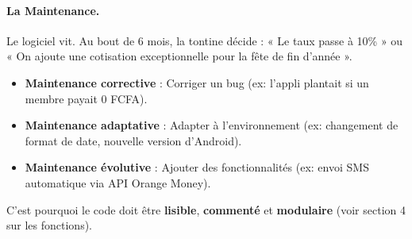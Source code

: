 \documentclass[11pt]{article}
\begin{document}
\paragraph{La Maintenance.}
Le logiciel vit. Au bout de 6 mois, la tontine décide : « Le taux passe à 10\% » ou « On ajoute une cotisation exceptionnelle pour la fête de fin d'année ».
\begin{itemize}
    \item \textbf{Maintenance corrective} : Corriger un bug (ex: l'appli plantait si un membre payait 0 FCFA).
    \item \textbf{Maintenance adaptative} : Adapter à l'environnement (ex: changement de format de date, nouvelle version d'Android).
    \item \textbf{Maintenance évolutive} : Ajouter des fonctionnalités (ex: envoi SMS automatique via API Orange Money).
\end{itemize}
C'est pourquoi le code doit être \textbf{lisible}, \textbf{commenté} et \textbf{modulaire} (voir section 4 sur les fonctions).
\end{document}
